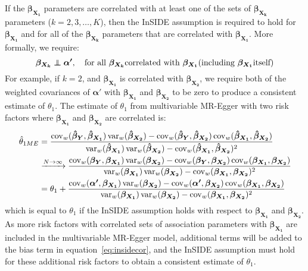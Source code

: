 \documentclass[a4paper,12pt]{article}
\DeclareMathOperator{\cov}{cov}
\DeclareMathOperator{\var}{var}
\newcommand\independent{\protect\mathpalette{\protect\independenT}{\perp}}
\def\independenT#1#2{\mathrel{\rlap{$#1#2$}\mkern2mu{#1#2}}}
\begin{document}
\begin{bibunit}[wileyj]
If the $\boldsymbol{\beta_{X_{1}}}$ parameters are correlated with at least one of the sets of $\boldsymbol{\beta_{X_{k}}}$ parameters ($k = 2, 3, \ldots, K$), then the InSIDE assumption is required to hold for $\boldsymbol{\beta_{X_{1}}}$ and for all of the $\boldsymbol{\beta_{X_{k}}}$ parameters that are correlated with  $\boldsymbol{\beta_{X_{1}}}$. More formally, we require: 
\begin{equation}
\boldsymbol{\beta_{X_{k}}} \independent \boldsymbol{\alpha'}, \quad \mbox{for all } \boldsymbol{\beta_{X_{k}}} \mbox{correlated with } \boldsymbol{\beta_{X_{1}}} (\mbox{including } \boldsymbol{\beta_{X_{1}}} \mbox{itself})
\end{equation}
For example, if $k=2$, and $\boldsymbol{\beta_{X_{1}}}$ is correlated with $\boldsymbol{\beta_{X_{2}}}$, we require both of the weighted covariances of $\boldsymbol{\alpha'}$ with $\boldsymbol{\beta_{X_{1}}}$ and $\boldsymbol{\beta_{X_{2}}}$ to be zero to produce a consistent estimate of $\theta_1$. The estimate of $\theta_1$ from multivariable MR-Egger with two risk factors where $\boldsymbol{\beta_{X_{1}}}$ and $\boldsymbol{\beta_{X_{2}}}$ are correlated is:
\begin{align}
\hat{\theta}_{1ME} &= \frac{\cov_w(\boldsymbol{\hat{\beta}_{Y}}, \boldsymbol{\hat{\beta}_{X_{1}}})\var_w(\boldsymbol{\hat{\beta}_{X_{2}}})-\cov_w(\boldsymbol{\hat{\beta}_{Y}}, \boldsymbol{\hat{\beta}_{X_{2}}})\cov_w(\boldsymbol{\hat{\beta}_{X_{1}}}, \boldsymbol{\hat{\beta}_{X_{2}}})}{\var_w(\boldsymbol{\hat{\beta}_{X_{1}}})\var_w(\boldsymbol{\hat{\beta}_{X_{2}}})-\cov_w(\boldsymbol{\hat{\beta}_{X_{1}}},\boldsymbol{\hat{\beta}_{X_{2}}})^{2}} \notag \\
&\xrightarrow{N \rightarrow \infty} \frac{\cov_w(\boldsymbol{\beta_{Y}}, \boldsymbol{\beta_{X_{1}}})\var_w(\boldsymbol{\beta_{X_{2}}})-\cov_w(\boldsymbol{\beta_{Y}}, \boldsymbol{\beta_{X_{2}}})\cov_w(\boldsymbol{\beta_{X_{1}}}, \boldsymbol{\beta_{X_{2}}})}{\var_w(\boldsymbol{\beta_{X_{1}}})\var_w(\boldsymbol{\beta_{X_{2}}})-\cov_w(\boldsymbol{\beta_{X_{1}}},\boldsymbol{\beta_{X_{2}}})^{2}} \notag \\
&=\theta_1 + \frac{\cov_w(\boldsymbol{\alpha'},\boldsymbol{\beta_{X_{1}}})\var_w(\boldsymbol{\beta_{X_{2}}})-\cov_w(\boldsymbol{\alpha'},\boldsymbol{\beta_{X_{2}}})\cov_w(\boldsymbol{\beta_{X_{1}}},\boldsymbol{\beta_{X_{2}}})}{\var_w(\boldsymbol{\beta_{X_{1}}})\var_w(\boldsymbol{\beta_{X_{2}}})-\cov_w(\boldsymbol{\beta_{X_{1}}},\boldsymbol{\beta_{X_{2}}})^{2}} \label{eq:insidecor}
\end{align}
which is equal to $\theta_1$ if the InSIDE assumption holds with respect to $\boldsymbol{\beta_{X_{1}}}$ and $\boldsymbol{\beta_{X_{2}}}$. As more risk factors with correlated sets of association parameters with $\boldsymbol{\beta_{X_{1}}}$ are included in the multivariable MR-Egger model, additional terms will be added to the bias term in equation~\ref{eq:insidecor}, and the InSIDE assumption must hold for these additional risk factors to obtain a consistent estimate of $\theta_1$.


\end{bibunit}
\end{document}
